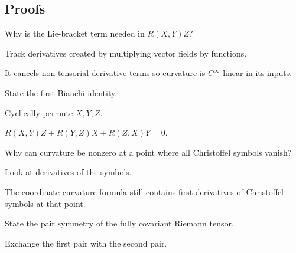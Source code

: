 \subsection*{Proofs}

\begin{exercise}[Tensoriality]\label{exr:vii26-ped-06}
Why is the Lie-bracket term needed in \(R(X,Y)Z\)?
\end{exercise}

\begin{hint}
Track derivatives created by multiplying vector fields by functions.
\end{hint}

\begin{solution}
It cancels non-tensorial derivative terms so curvature is \(C^\infty\)-linear in its inputs.
\end{solution}

\begin{exercise}[Bianchi]\label{exr:vii26-ped-07}
State the first Bianchi identity.
\end{exercise}

\begin{hint}
Cyclically permute \(X,Y,Z\).
\end{hint}

\begin{solution}
\(R(X,Y)Z+R(Y,Z)X+R(Z,X)Y=0\).
\end{solution}

\begin{exercise}\label{exr:vii26-ped-08}
Why can curvature be nonzero at a point where all Christoffel symbols vanish?
\end{exercise}

\begin{hint}
Look at derivatives of the symbols.
\end{hint}

\begin{solution}
The coordinate curvature formula still contains first derivatives of Christoffel symbols at that point.
\end{solution}

\begin{exercise}\label{exr:vii26-ped-09}
State the pair symmetry of the fully covariant Riemann tensor.
\end{exercise}

\begin{hint}
Exchange the first pair with the second pair.
\end{hint}

